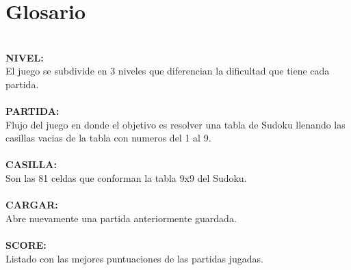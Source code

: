 \documentclass[12pt,oneside]{book}
\begin{document}
\chapter{Glosario}
\ \\
\textbf{NIVEL:} \\ El juego se subdivide en 3 niveles que diferencian la dificultad que tiene cada partida.
\ \\ \ \\ 
\textbf{PARTIDA:} \\ Flujo del juego en donde el objetivo es resolver una tabla de Sudoku llenando las casillas vacias de la tabla con numeros del 1 al 9.
\ \\ \ \\ 
\textbf{CASILLA:} \\Son las 81 celdas que conforman la tabla 9x9 del Sudoku.
\ \\ \ \\ 
\textbf{CARGAR:} \\ Abre nuevamente una partida anteriormente guardada.
\ \\ \ \\
\textbf{SCORE:} \\ Listado con las mejores puntuaciones de las partidas jugadas.
\end{document}
